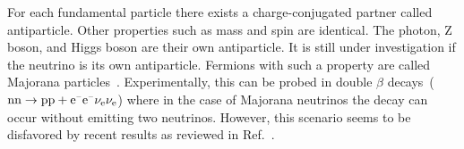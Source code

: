 
For each fundamental particle there exists a charge-conjugated partner called antiparticle. Other properties such as mass and spin are identical. The photon, Z boson, and Higgs boson are their own antiparticle. It is still under investigation if the neutrino is its own antiparticle. Fermions with such a property are called Majorana particles~\cite{Majorana2006}. Experimentally, this can be probed in double $\beta$ decays~($\mathrm{nn}\to\mathrm{pp}+\mathrm{e}^{\rmminus}\mathrm{e}^{\rmminus}\nu_\mathrm{e}\nu_\mathrm{e}$) where in the case of Majorana neutrinos the decay can occur without emitting two neutrinos. However, this scenario seems to be disfavored by recent results as reviewed in Ref.~\cite{Dell'Oro:2016dbc}.



